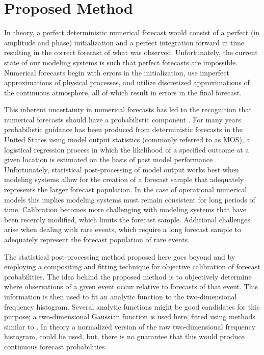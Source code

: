 

\chapter{Proposed Method}
\label{method}

In theory, a perfect deterministic numerical forecast would consist of a perfect (in amplitude and phase) initialization and a perfect integration forward in time resulting in the correct forecast of what was observed. Unfortunately, the current state of our modeling systems is such that perfect forecasts are impossible. Numerical forecasts begin with errors in the initialization, use imperfect approximations of physical processes, and utilize discretized approximations of the continuous atmosphere, all of which result in errors in the final forecast.

This inherent uncertainty in numerical forecasts has led to the recognition that numerical forecasts should have a probabilistic component \citep{ADD}. For many years probabilistic guidance has been produced from deterministic forecasts in the United States using model output statistics (commonly referred to as MOS), a logistical regression process in which the likelihood of a specified outcome at a given location is estimated on the basis of past model performance \citep{Glahn1972}. Unfortunately, statistical post-processing of model output works best when modeling systems allow for the creation of a forecast sample that adequately represents the larger forecast population. In the case of operational numerical models this implies modeling systems must remain consistent for long periods of time. Calibration becomes more challenging with modeling systems that have been recently modified, which limits the forecast sample. Additional challenges arise when dealing with rare events, which require a long forecast sample to adequately represent the forecast population of rare events.

The statistical post-processing method proposed here goes beyond \cite{Theis2005} and \cite{Sobash2011} by employing a compositing and fitting technique for objective calibration of forecast probabilities. The idea behind the proposed method is to objectively determine where observations of a given event occur relative to forecasts of that event. This information is then used to fit an analytic function to the two-dimensional frequency histogram. Several analytic functions might be good candidates for this purpose; a two-dimensional Gaussian function is used here, fitted using methods similar to \cite{Lak2010}. In theory a normalized version of the raw two-dimensional frequency histogram, could be used, but, there is no guarantee that this would produce continuous forecast probabilities.




